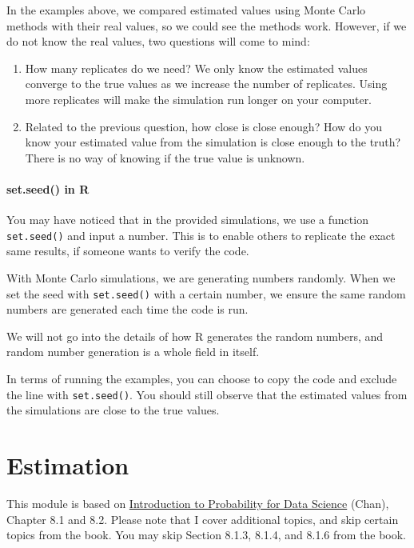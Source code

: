 \documentclass[
]{book}
\begin{document}
In the examples above, we compared estimated values using Monte Carlo methods with their real values, so we could see the methods work. However, if we do not know the real values, two questions will come to mind:

\begin{enumerate}
\def\labelenumi{\arabic{enumi}.}
\item
  How many replicates do we need? We only know the estimated values converge to the true values as we increase the number of replicates. Using more replicates will make the simulation run longer on your computer.
\item
  Related to the previous question, how close is close enough? How do you know your estimated value from the simulation is close enough to the truth? There is no way of knowing if the true value is unknown.
\end{enumerate}

\hypertarget{set.seed-in-r}{%
\subsubsection{set.seed() in R}\label{set.seed-in-r}}

You may have noticed that in the provided simulations, we use a function \texttt{set.seed()} and input a number. This is to enable others to replicate the exact same results, if someone wants to verify the code.

With Monte Carlo simulations, we are generating numbers randomly. When we set the seed with \texttt{set.seed()} with a certain number, we ensure the same random numbers are generated each time the code is run.

We will not go into the details of how R generates the random numbers, and random number generation is a whole field in itself.

In terms of running the examples, you can choose to copy the code and exclude the line with \texttt{set.seed()}. You should still observe that the estimated values from the simulations are close to the true values.

\hypertarget{est}{%
\chapter{Estimation}\label{est}}

This module is based on \href{https://probability4datascience.com}{Introduction to Probability for Data Science} (Chan), Chapter 8.1 and 8.2. Please note that I cover additional topics, and skip certain topics from the book. You may skip Section 8.1.3, 8.1.4, and 8.1.6 from the book.
\end{document}
